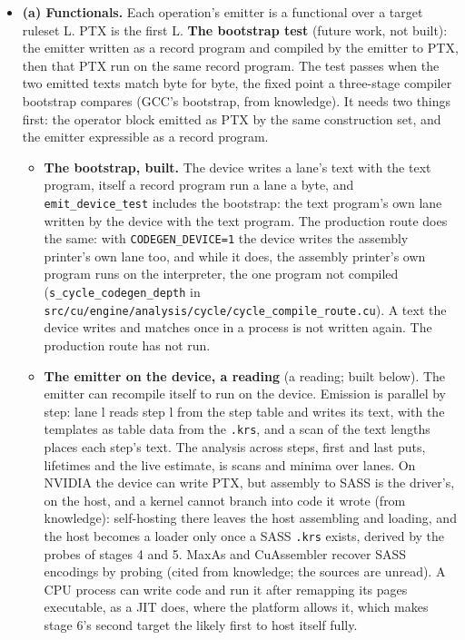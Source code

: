 \begin{enumerate}
\begin{itemize}
\item \textbf{(a) Functionals.} Each operation's emitter is a functional over a target ruleset L. PTX is the first L. \textbf{The bootstrap test} (future work, not built): the emitter written as a record program and compiled by the emitter to PTX, then that PTX run on the same record program. The test passes when the two emitted texts match byte for byte, the fixed point a three-stage compiler bootstrap compares (GCC's bootstrap, from knowledge). It needs two things first: the operator block emitted as PTX by the same construction set, and the emitter expressible as a record program.

\begin{itemize}
\item \textbf{The bootstrap, built.} The device writes a lane's text with the text program, itself a record program run a lane a byte, and \texttt{emit\_\allowbreak{}device\_\allowbreak{}test} includes the bootstrap: the text program's own lane written by the device with the text program. The production route does the same: with \texttt{CODEGEN\_\allowbreak{}DEVICE=1} the device writes the assembly printer's own lane too, and while it does, the assembly printer's own program runs on the interpreter, the one program not compiled (\texttt{s\_\allowbreak{}cycle\_\allowbreak{}codegen\_\allowbreak{}depth} in \texttt{src/\allowbreak{}cu/\allowbreak{}engine/\allowbreak{}analysis/\allowbreak{}cycle/\allowbreak{}cycle\_\allowbreak{}compile\_\allowbreak{}route.\allowbreak{}cu}). A text the device writes and matches once in a process is not written again. The production route has not run.
\item \textbf{The emitter on the device, a reading} (a reading; built below). The emitter can recompile itself to run on the device. Emission is parallel by step: lane l reads step l from the step table and writes its text, with the templates as table data from the \texttt{.\allowbreak{}krs}, and a scan of the text lengths places each step's text. The analysis across steps, first and last puts, lifetimes and the live estimate, is scans and minima over lanes. On NVIDIA the device can write PTX, but assembly to SASS is the driver's, on the host, and a kernel cannot branch into code it wrote (from knowledge): self-hosting there leaves the host assembling and loading, and the host becomes a loader only once a SASS \texttt{.\allowbreak{}krs} exists, derived by the probes of stages 4 and 5. MaxAs and CuAssembler recover SASS encodings by probing (cited from knowledge; the sources are unread). A CPU process can write code and run it after remapping its pages executable, as a JIT does, where the platform allows it, which makes stage 6's second target the likely first to host itself fully.


\end{itemize}
\end{itemize}
\end{enumerate}
